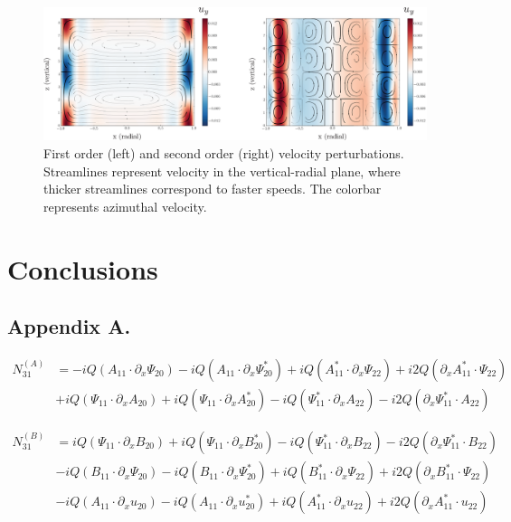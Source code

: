\documentclass{emulateapj}
\newcommand{\beq}{\begin{equation}}
\newcommand{\eeq}{\end{equation}}
\begin{document}
\begin{figure}[h!]
\centering
\includegraphics[scale=0.5]{twoorders_velocity.eps}
\caption{First order (left) and second order (right) velocity perturbations. Streamlines represent velocity in the vertical-radial plane, where thicker streamlines correspond to faster speeds. The colorbar represents azimuthal velocity.}
\end{figure}

\section{Conclusions}

\newpage
\begin{appendices}
\begin{widetext}
\section*{Appendix A.}
\beq
\begin{split}
N_{31}^{(A)} & = -i Q \left(A_{11}\cdot\partial_x \Psi_{20}\right) - i Q \left(A_{11} \cdot \partial_x \Psi_{20}^*\right)
 + i Q \left(A_{11}^* \cdot \partial_x \Psi_{22}\right) + i 2 Q \left(\partial_x A_{11}^* \cdot \Psi_{22}\right) \\
 & + i Q \left(\Psi_{11} \cdot \partial_x A_{20}\right) + i Q \left(\Psi_{11} \cdot \partial_x A_{20}^*\right) - i Q \left(\Psi_{11}^* \cdot \partial_x A_{22} \right) - i 2 Q \left(\partial_x \Psi_{11}^* \cdot A_{22}\right)
\end{split}
\eeq

\beq
\begin{split}
N_{31}^{(B)} & = i Q \left(\Psi_{11} \cdot \partial_x B_{20}\right) + i Q \left(\Psi_{11} \cdot \partial_x B_{20}^*\right) - i Q \left(\Psi_{11}^* \cdot \partial_x B_{22}\right) - i 2 Q\left(\partial_x \Psi_{11}^* \cdot B_{22}\right) \\
& - i Q \left(B_{11} \cdot \partial_x \Psi_{20}\right) - i Q \left(B_{11} \cdot \partial_x \Psi_{20}^*\right) + i Q\left(B_{11}^* \cdot \partial_x \Psi_{22}\right) + i 2 Q \left(\partial_x B_{11}^* \cdot \Psi_{22}\right) \\
& - i Q \left(A_{11} \cdot \partial_x u_{20}\right) - i Q \left(A_{11} \cdot \partial_x u_{20}^*\right) + i Q \left(A_{11}^* \cdot \partial_x u_{22}\right) + i 2 Q \left(\partial_x A_{11}^* \cdot u_{22}\right)
\end{split}
\eeq





\end{widetext}
\end{appendices}
\end{document}
